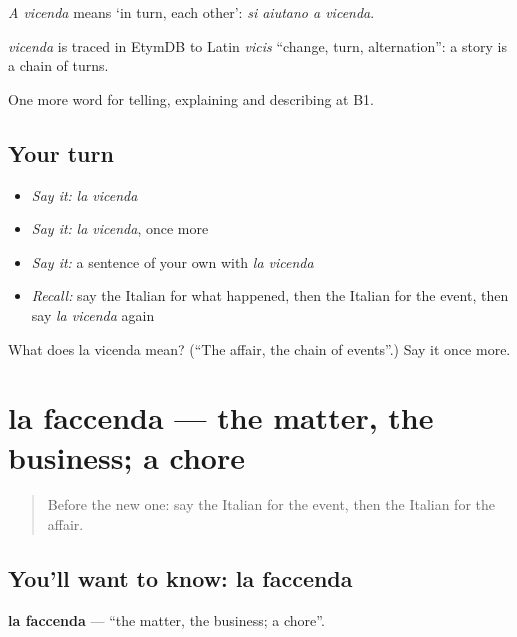 \emph{A vicenda} means ‘in turn, each other’: \emph{si aiutano a vicenda}.

\begin{cousinweb}
\emph{vicenda} is traced in EtymDB to Latin \emph{vicis} \textquotedblleft{}change, turn, alternation\textquotedblright{}: a story is a chain of turns.
\end{cousinweb}

\begin{grammarlens}[title={What you've built}]
One more word for telling, explaining and describing at B1.
\end{grammarlens}

\subsection*{Your turn}
\begin{itemize}
\raggedright
  \item \emph{Say it:} \emph{la vicenda}
  \item \emph{Say it:} \emph{la vicenda}, once more
  \item \emph{Say it:} a sentence of your own with \emph{la vicenda}
  \item \emph{Recall:} say the Italian for what happened, then the Italian for the event, then say \emph{la vicenda} again
\end{itemize}

\begin{tcolorbox}[breakable,colback=teal!4,colframe=teal!35!black,title={Before you move on}]
What does la vicenda mean? (\textquotedblleft{}The affair, the chain of events\textquotedblright{}.) Say it once more.
\end{tcolorbox}
\section[la faccenda]{la faccenda — the matter, the business; a chore}

\label{lesson:IT-C276-faccenda}



\begin{quote}
Before the new one: say the Italian for the event, then the Italian for the affair.
\end{quote}

\subsection*{You'll want to know: la faccenda}
\textbf{la faccenda} — \textquotedblleft{}the matter, the business; a chore\textquotedblright{}.

